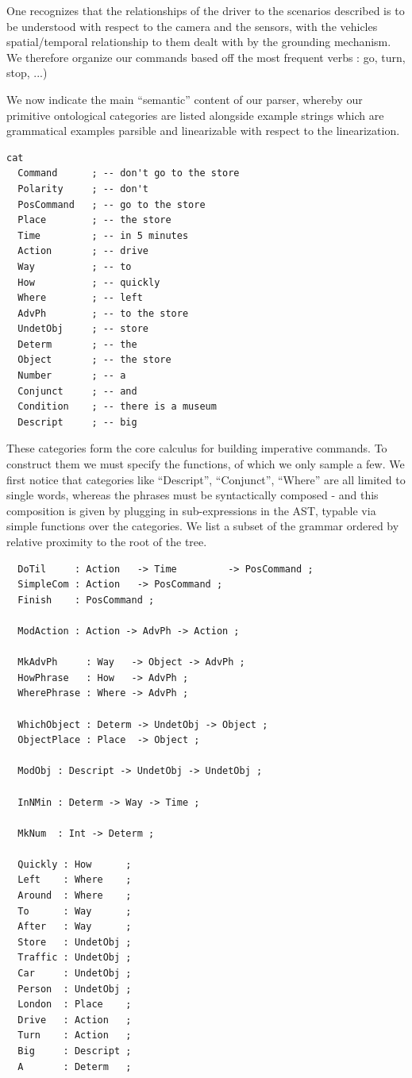 \documentclass[a4paper, 11pt]{article}
\begin{document}
One recognizes that the relationships of the driver to the scenarios described is to
be understood with respect to the camera and the sensors, with the vehicles spatial/temporal relationship to
them dealt with by the grounding mechanism. We therefore organize our commands
based off the most frequent verbs : go, turn, stop, ...)

We now indicate the main ``semantic'' content of our parser, whereby our
primitive ontological categories are listed alongside example strings which
are grammatical examples parsible and linearizable with respect to the
linearization.

\begin{verbatim}
cat
  Command      ; -- don't go to the store
  Polarity     ; -- don't
  PosCommand   ; -- go to the store
  Place        ; -- the store
  Time         ; -- in 5 minutes
  Action       ; -- drive
  Way          ; -- to
  How          ; -- quickly
  Where        ; -- left
  AdvPh        ; -- to the store
  UndetObj     ; -- store
  Determ       ; -- the
  Object       ; -- the store
  Number       ; -- a
  Conjunct     ; -- and
  Condition    ; -- there is a museum
  Descript     ; -- big
\end{verbatim}

These categories form the core calculus for building imperative commands. To
construct them we must specify the functions, of which we only sample a few. We
first notice that categories like ``Descript'', ``Conjunct'', ``Where'' are all
limited to single words, whereas the phrases must be syntactically composed - and
this composition is given by plugging in sub-expressions in the AST, typable via
simple functions over the categories. We list a subset of the grammar ordered by
relative proximity to the root of the tree.

\begin{verbatim}
  DoTil     : Action   -> Time         -> PosCommand ;
  SimpleCom : Action   -> PosCommand ;
  Finish    : PosCommand ;

  ModAction : Action -> AdvPh -> Action ;

  MkAdvPh     : Way   -> Object -> AdvPh ;
  HowPhrase   : How   -> AdvPh ;
  WherePhrase : Where -> AdvPh ;

  WhichObject : Determ -> UndetObj -> Object ;
  ObjectPlace : Place  -> Object ;

  ModObj : Descript -> UndetObj -> UndetObj ;

  InNMin : Determ -> Way -> Time ;

  MkNum  : Int -> Determ ;

  Quickly : How      ;
  Left    : Where    ;
  Around  : Where    ;
  To      : Way      ;
  After   : Way      ;
  Store   : UndetObj ;
  Traffic : UndetObj ;
  Car     : UndetObj ;
  Person  : UndetObj ;
  London  : Place    ;
  Drive   : Action   ;
  Turn    : Action   ;
  Big     : Descript ;
  A       : Determ   ;
\end{verbatim}
\end{document}
